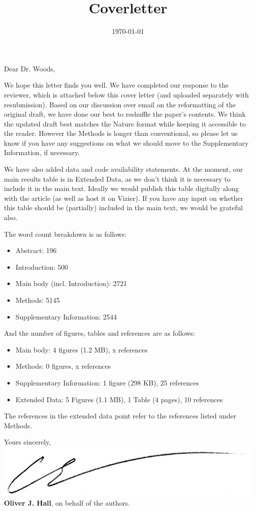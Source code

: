 \documentclass[11pt, a4paper, sans, colorlinks, linkcolor=True]{moderncv}
\title{Coverletter}
\begin{document}
\hypersetup{urlcolor=links}
\recipient{\ }{\ }
\date{\today}
\opening{Dear Dr. Woods,}
\makelettertitle
\justify
\vspace{-0.5cm}

We hope this letter finds you well. We have completed our response to the reviewer, which is attached below this cover letter (and uploaded separately with resubmission). Based on our discussion over email on the reformatting of the original draft, we have done our best to reshuffle the paper's contents. We think the updated draft best matches the Nature format while keeping it accessible to the reader. However the Methods is longer than conventional, so please let us know if you have any suggestions on what we should move to the Supplementary Information, if necessary.

We have also added data and code availability statements. At the moment, our main results table is in Extended Data, as we don't think it is necessary to include it in the main text. Ideally we would publish this table digitally along with the article (as well as host it on Vizier). If you have any input on whether this table should be (partially) included in the main text, we would be grateful also.

The word count breakdown is as follows:
\begin{itemize}
	\item Abstract: 196
	\item Introduction: 500
	\item Main body (incl. Introduction): 2721
	\item Methods: 5145
	\item Supplementary Information: 2544
\end{itemize}

And the number of figures, tables and references are as follows:
\begin{itemize}
	\item Main body: 4 figures (1.2 MB), x references
	\item Methods: 0 figures, x references
	\item Supplementary Information: 1 figure (298 KB), 25 references
	\item Extended Data: 5 Figures (1.1 MB), 1 Table (4 pages), 10 references
\end{itemize}

The references in the extended data point refer to the references listed under Methods.
\vspace{0.5cm}

Yours sincerely, \\
\vspace{0.5em}
\includegraphics[scale=0.2]{signature.png} \\ 
\vspace{0.5em}
\textbf{Oliver J. Hall}, on behalf of the authors. \\
\end{document}
